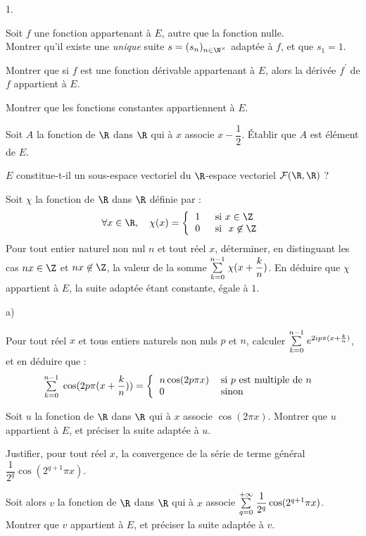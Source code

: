 \documentclass[11pt]{article}%
\begin{document}
\begin{noliste}{1.}
 \setlength{\itemsep}{4mm}
\item Soit $f$ une fonction appartenant à $E$, autre que la fonction
nulle.
\\
Montrer qu'il existe une \textit{unique} suite $s = (s_{n})_{n\in
\N^{\times }}$ adaptée à $f$, et que $s_{1} = 1$.

\item Montrer que si $f$ est une fonction dérivable appartenant à $E$,
alors
la dérivée $f^{\prime }$ de $f$ appartient à $E$.

\item Montrer que les fonctions constantes appartiennent à $E$.

\item Soit $A$ la fonction de $\R$ dans $\R$ qui à $x$
associe $x-\dfrac{1}{2}$. Établir que $A$ est élément de $E$.

\item $E$ constitue-t-il un sous-espace vectoriel du $\R$-espace
vectoriel $\mathcal{F}(\R,\R)$ ?

\item Soit $\chi $ la fonction de $\R$ dans $\R$ définie par :
\[
\forall x\in \R,\quad \chi (x) = \left\{
\begin{tabular}{ll}
$1$ & \textrm{\ }si\textrm{\ }$x\in \Z$ \\
$0$ & \textrm{\ }si\textrm{\ } $x\not\in \Z$\end{tabular}\right.
\]
Pour tout entier naturel non nul $n$ et tout réel $x$, déterminer, en
distinguant les cas $nx\in \Z$ et $nx\not\in \Z$, la valeur
de la somme ${\textstyle\sum\limits_{k = 0}^{n-1}}\hspace{.1cm}\chi (x + \dfrac{k}{n})$. En déduire que
$\chi $ appartient à $E$, la suite adaptée étant constante, égale à
$1$.

\item 

\begin{noliste}{a)}
 \setlength{\itemsep}{2mm}
\item Pour tout réel $x$ et tous entiers naturels non nuls $p$ et $n$,
calculer ${\textstyle\sum\limits_{k = 0}^{n-1}}\hspace{.1cm}e^{2ip\pi (x + \frac{k}{n})}$, et en déduire
que :
\[
\Sum{k = 0}{n-1}\cos (2p\pi (x + \frac{k}{n})) = \left\{
\begin{tabular}{ll}
$n\cos (2p\pi x)$ & si $p$ est multiple de $n$ \\
$0$ & sinon\end{tabular}\right. \
\]

\item Soit $u$ la fonction de $\R$ dans $\R$ qui à $x$
associe $\cos (2\pi x)$. Montrer que $u$ appartient à $E$, et préciser
la
suite adaptée à $u$.

\item Justifier, pour tout réel $x$, la convergence de la série de
terme général $\dfrac{1}{2^{q}}\cos (2^{q + 1}\pi x)$.

Soit alors $v$ la fonction de $\R$ dans $\R$ qui à $x$
associe ${\textstyle\sum\limits_{q = 0}^{+ \infty }}\hspace{.1cm}\dfrac{1}{2^{q}}\cos (2^{q + 1}\pi x)$.
\\
Montrer que $v$ appartient à $E$, et préciser la suite adaptée à $v$.
\end{noliste}
\end{noliste}
\end{document}
